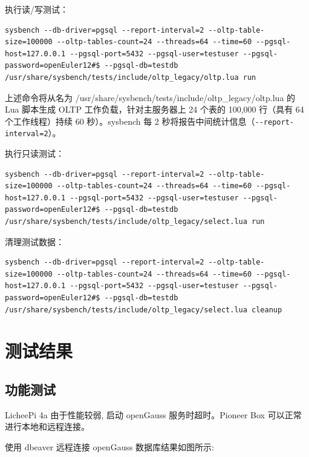 \documentclass{article}
\begin{document}
执行读/写测试：

\begin{verbatim}
sysbench --db-driver=pgsql --report-interval=2 --oltp-table-size=100000 --oltp-tables-count=24 --threads=64 --time=60 --pgsql-host=127.0.0.1 --pgsql-port=5432 --pgsql-user=testuser --pgsql-password=openEuler12#$ --pgsql-db=testdb /usr/share/sysbench/tests/include/oltp_legacy/oltp.lua run
\end{verbatim}

上述命令将从名为 /usr/share/sysbench/tests/include/oltp\_legacy/oltp.lua 的 Lua 脚本生成 OLTP 工作负载，针对主服务器上 24 个表的 100,000 行（具有 64 个工作线程）持续 60 秒）。sysbench 每 2 秒将报告中间统计信息（\verb!--report-interval=2!）。

执行只读测试：

\begin{verbatim}
sysbench --db-driver=pgsql --report-interval=2 --oltp-table-size=100000 --oltp-tables-count=24 --threads=64 --time=60 --pgsql-host=127.0.0.1 --pgsql-port=5432 --pgsql-user=testuser --pgsql-password=openEuler12#$ --pgsql-db=testdb /usr/share/sysbench/tests/include/oltp_legacy/select.lua run
\end{verbatim}

清理测试数据：

\begin{verbatim}
sysbench --db-driver=pgsql --report-interval=2 --oltp-table-size=100000 --oltp-tables-count=24 --threads=64 --time=60 --pgsql-host=127.0.0.1 --pgsql-port=5432 --pgsql-user=testuser --pgsql-password=openEuler12#$ --pgsql-db=testdb /usr/share/sysbench/tests/include/oltp_legacy/select.lua cleanup
\end{verbatim}


\section{测试结果}

\subsection{功能测试}
LicheePi 4a 由于性能较弱, 启动 openGauss 服务时超时。Pioneer Box 可以正常进行本地和远程连接。

使用 dbeaver 远程连接 openGauss 数据库结果如图所示:
\end{document}
